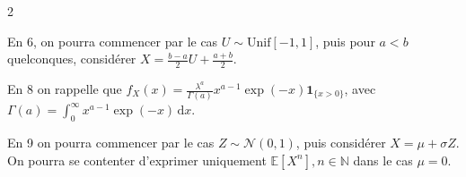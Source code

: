 \documentclass{article}
\begin{document}
\begin{paracol}{2}
{En 6, on pourra commencer par le cas $U \sim \mathrm{Unif}[-1, 1]$, puis pour $a < b$ quelconques, considérer $X = \frac{b-a}{2}U + \frac{a+b}{2}$.

En 8 on rappelle que $f_X(x) = \frac{\lambda^a}{\Gamma(a)} x^{a-1} \exp(-x) \mathbf{1}_{\{x>0\}}$, avec $\Gamma(a) = \int_0^\infty x^{a-1} \exp(-x) \, \mathrm{d}x$.

En 9 on pourra commencer par le cas $Z \sim \mathcal{N}(0, 1)$, puis considérer $X = \mu + \sigma Z$. On pourra se contenter d'exprimer uniquement $\mathbb{E}[X^n], n \in \mathbb{N}$ dans le cas $\mu = 0$.
}
\end{paracol}
\end{document}
